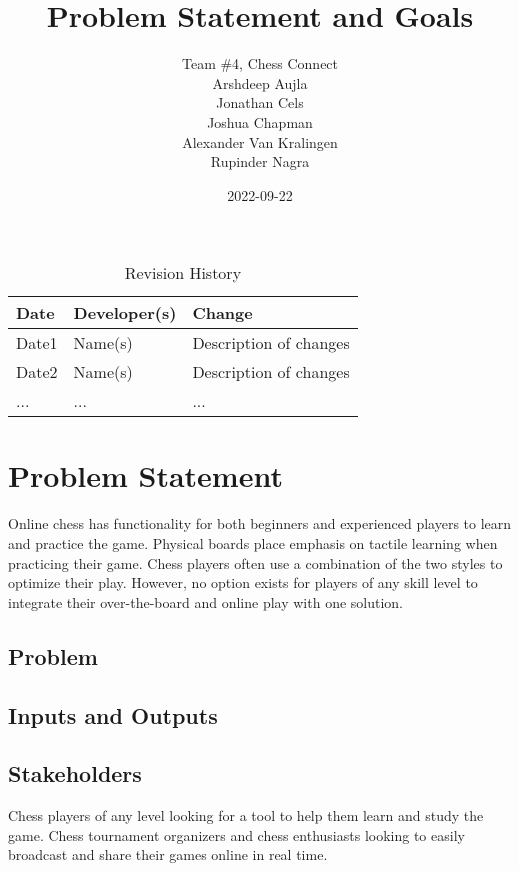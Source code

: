 \documentclass{article}
\title{Problem Statement and Goals\\\progname}
\author{Team \#4, Chess Connect
      \\ Arshdeep Aujla
      \\ Jonathan Cels
      \\ Joshua Chapman
      \\ Alexander Van Kralingen
      \\ Rupinder Nagra}
\date{2022-09-22}
\begin{document}
\maketitle

\begin{table}[hp]
\caption{Revision History} \label{TblRevisionHistory}
\begin{tabularx}{\textwidth}{llX}
\toprule
\textbf{Date} & \textbf{Developer(s)} & \textbf{Change}\\
\midrule
Date1 & Name(s) & Description of changes\\
Date2 & Name(s) & Description of changes\\
... & ... & ...\\
\bottomrule
\end{tabularx}
\end{table}

\section{Problem Statement}

{Online chess has functionality for both beginners and experienced players to learn and practice the game. Physical boards place emphasis on tactile learning when practicing their game. Chess players often use a combination of the two styles to optimize their play. However, no option exists for players of any skill level to integrate their over-the-board and online play with one solution.}

\subsection{Problem}

\subsection{Inputs and Outputs}


\subsection{Stakeholders}
Chess players of any level looking for a tool to help them learn and study the game. Chess tournament organizers and chess enthusiasts looking to easily broadcast and share their games online in real time. 
\end{document}
